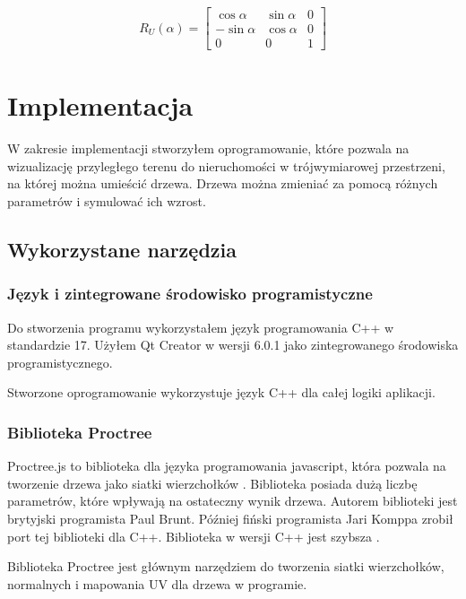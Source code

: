 \documentclass[a4paper,12pt,twoside]{book} %
\begin{document}
\begin{gather}
	R_{U}(\alpha) =  
	\begin{bmatrix}
		\cos{\alpha} & \sin{\alpha} & 0   \\
		-\sin{\alpha} & \cos{\alpha} &  0 \\
		0 & 0 & 1
	\end{bmatrix}
\end{gather}



\chapter{Implementacja} 

W zakresie implementacji stworzyłem oprogramowanie, które pozwala na 
wizualizację przyległego terenu do nieruchomości w trójwymiarowej 
przestrzeni, na której można umieścić drzewa. Drzewa można 
zmieniać za pomocą różnych parametrów i symulować ich wzrost.

\section{Wykorzystane narzędzia}

\subsection{Język i zintegrowane środowisko programistyczne}

Do stworzenia programu wykorzystałem język programowania 
C++ w standardzie 17. Użyłem Qt Creator w wersji 6.0.1 jako 
zintegrowanego środowiska programistycznego.

Stworzone oprogramowanie wykorzystuje język C++ dla całej logiki aplikacji.

\subsection{Biblioteka Proctree}

Proctree.js to biblioteka dla języka programowania javascript, 
która pozwala na tworzenie drzewa jako siatki wierzchołków \cite{proctreejs}.
Biblioteka posiada dużą liczbę parametrów, które wpływają na 
ostateczny wynik drzewa. Autorem biblioteki jest brytyjski 
programista Paul Brunt. Później fiński programista Jari Komppa 
zrobił port tej biblioteki dla C++. Biblioteka w wersji C++ jest szybsza \cite{proctree}.

Biblioteka Proctree jest głównym narzędziem do tworzenia siatki wierzchołków,
normalnych i mapowania UV dla drzewa w programie.
\end{document}
